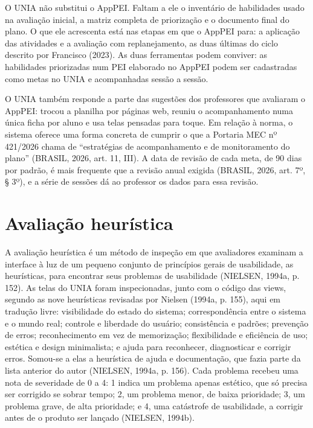 O UNIA não substitui o AppPEI. Faltam a ele o inventário de habilidades usado na avaliação inicial, a matriz completa de priorização e o documento final do plano. O que ele acrescenta está nas etapas em que o AppPEI para: a aplicação das atividades e a avaliação com replanejamento, as duas últimas do ciclo descrito por Francisco (2023). As duas ferramentas podem conviver: as habilidades priorizadas num PEI elaborado no AppPEI podem ser cadastradas como metas no UNIA e acompanhadas sessão a sessão.

O UNIA também responde a parte das sugestões dos professores que avaliaram o AppPEI: trocou a planilha por páginas web, reuniu o acompanhamento numa única ficha por aluno e usa telas pensadas para toque. Em relação à norma, o sistema oferece uma forma concreta de cumprir o que a Portaria MEC nº 421/2026 chama de “estratégias de acompanhamento e de monitoramento do plano” (BRASIL, 2026, art. 11, III). A data de revisão de cada meta, de 90 dias por padrão, é mais frequente que a revisão anual exigida (BRASIL, 2026, art. 7º, § 3º), e a série de sessões dá ao professor os dados para essa revisão.

\section{Avaliação heurística}\label{sec:5.3}

A avaliação heurística é um método de inspeção em que avaliadores examinam a interface à luz de um pequeno conjunto de princípios gerais de usabilidade, as heurísticas, para encontrar seus problemas de usabilidade (NIELSEN, 1994a, p. 152). As telas do UNIA foram inspecionadas, junto com o código das views, segundo as nove heurísticas revisadas por Nielsen (1994a, p. 155), aqui em tradução livre: visibilidade do estado do sistema; correspondência entre o sistema e o mundo real; controle e liberdade do usuário; consistência e padrões; prevenção de erros; reconhecimento em vez de memorização; flexibilidade e eficiência de uso; estética e design minimalista; e ajuda para reconhecer, diagnosticar e corrigir erros. Somou-se a elas a heurística de ajuda e documentação, que fazia parte da lista anterior do autor (NIELSEN, 1994a, p. 156). Cada problema recebeu uma nota de severidade de 0 a 4: 1 indica um problema apenas estético, que só precisa ser corrigido se sobrar tempo; 2, um problema menor, de baixa prioridade; 3, um problema grave, de alta prioridade; e 4, uma catástrofe de usabilidade, a corrigir antes de o produto ser lançado (NIELSEN, 1994b).

